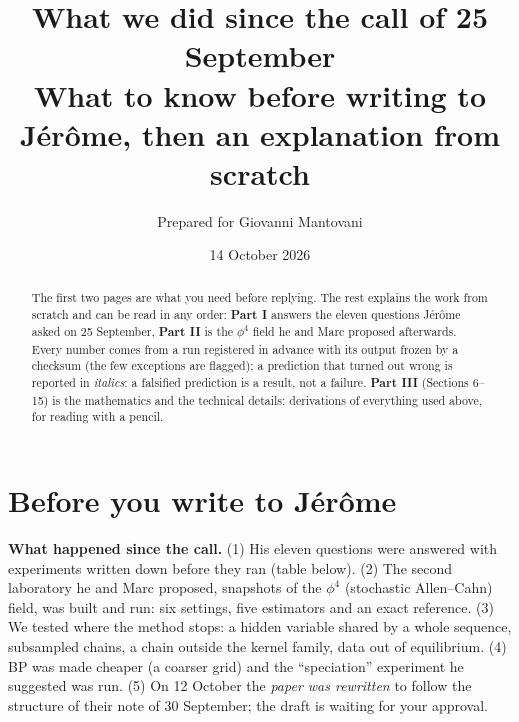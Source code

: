\documentclass[11pt,a4paper]{article}
\title{\textbf{What we did since the call of 25 September}\\[0.3em]\large What to know before writing to Jérôme, then an explanation from scratch}
\author{Prepared for Giovanni Mantovani}
\date{14 October 2026}
\newcommand{\fals}[1]{{\small\itshape #1}}
\begin{document}
\maketitle
\vspace{-1.6em}

\begin{abstract}\noindent
The first two pages are what you need before replying. The rest explains the work from scratch and can be read in any order:
\textbf{Part I} answers the eleven questions Jérôme asked on 25 September, \textbf{Part II} is the $\phi^4$ field he and Marc proposed
afterwards. Every number comes from a run registered in advance with its output frozen by a checksum (the few exceptions are
flagged); a prediction that turned out wrong is reported in \fals{italics}: a falsified prediction is a result, not a failure.
\textbf{Part III} (Sections 6--15) is the mathematics and the technical details: derivations of everything used above, for reading with a pencil.
\end{abstract}



\section*{Before you write to Jérôme}

\textbf{What happened since the call.} (1) His eleven questions were answered with experiments written down before they ran
(table below). (2) The second laboratory he and Marc proposed, snapshots of the $\phi^4$ (stochastic Allen--Cahn) field, was built
and run: six settings, five estimators and an exact reference. (3) We tested where the method stops: a hidden variable shared by a
whole sequence, subsampled chains, a chain outside the kernel family, data out of equilibrium. (4) BP was made cheaper (a coarser
grid) and the ``speciation'' experiment he suggested was run. (5) On 12 October the \emph{paper was rewritten} to follow the
structure of their note of 30 September; the draft is waiting for your approval.
\end{document}
